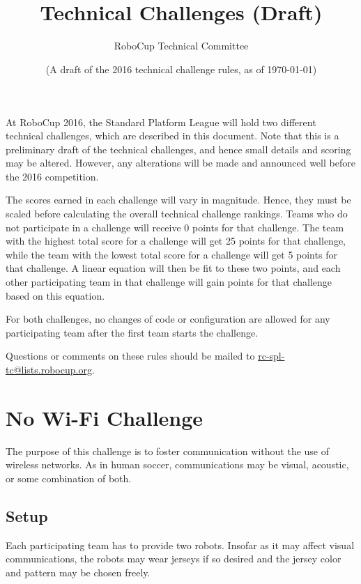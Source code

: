 \documentclass[12pt]{article}
\title{\leaguename \\ Technical Challenges (Draft)}
\author{RoboCup Technical Committee}
\date{(A draft of the 2016 technical challenge rules, as of \today)}
\begin{document}
\maketitle

At RoboCup 2016, the Standard Platform League will hold two different technical challenges, which are described in this document.  Note that this is a preliminary draft of the technical challenges, and hence small details and scoring may be altered.  However, any alterations will be made and announced well before the 2016 competition.

The scores earned in each challenge will vary in magnitude.  Hence, they must be scaled before calculating the overall technical challenge rankings.  Teams who do not participate in a challenge will receive 0 points for that challenge.  The team with the highest total score for a challenge will get 25 points for that challenge, while the team with the lowest total score for a challenge will get 5 points for that challenge.  A linear equation will then be fit to these two points, and each other participating team in that challenge will gain points for that challenge based on this equation.

For both challenges, no changes of code or configuration are allowed for any participating team after the first team starts the challenge. 

Questions or comments on these rules should be mailed to {\small \url{rc-spl-tc@lists.robocup.org}}.

\vfill

\renewcommand\contentsname{Challenges}
\tableofcontents
\setcounter{tocdepth}{1}

\thispagestyle{fancy}

\clearpage

\cfoot{\thepage}
\setcounter{page}{1}

\newcommand{\openMinNum}{three}




\section{No Wi-Fi Challenge}

The purpose of this challenge is to foster communication without the use of wireless networks.
As in human soccer, communications may be visual, acoustic, or some combination of both.

\subsection{Setup}
Each participating team has to provide two robots. Insofar as it may affect visual communications,
the robots may wear jerseys if so desired and the
jersey color and pattern may be chosen freely. 
\end{document}
